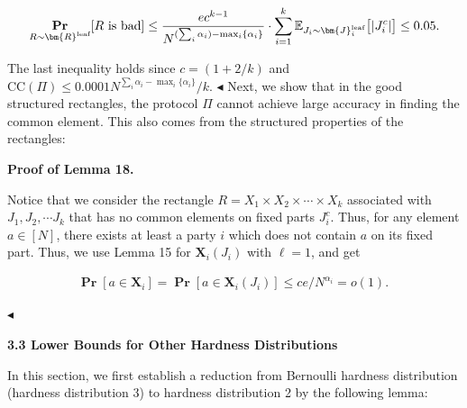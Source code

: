 \documentclass[10pt,a4paper]{article}
\begin{document}
\[\begin{gathered}
\operatorname*{\mathbf{Pr}}_{R\sim\bm{R}^{\text{leaf}}}[R\text{ is bad}]\leq\frac{ec^{k-1}}{N^{(\sum_{i}\alpha_{i})-\mathop{\max}_{i}\{\alpha_{i}\}}}\cdot\sum_{i=1}^{k}\mathbb{E}_{J_{i}\sim\bm{J}_{i}^{\text{leaf}}}\big{[}|J_{i}^{c}|\big{]}\leq 0.05.
\end{gathered}\]


The last inequality holds since $c=(1+2/k)$ and $\text{CC}(\Pi)\leq 0.0001N^{\sum_{i}{\alpha_{i}}-\mathop{\max}_{i}\{\alpha_{i}\}}/k$.
$\blacktriangleleft$
Next, we show that in the good structured rectangles, the protocol $\Pi$ cannot achieve large accuracy in finding the common element. This also comes from the structured properties of the rectangles:\par





\par\medskip\noindent\textbf{Proof of Lemma 18.}\par




Notice that we consider the rectangle $R=X_{1}\times X_{2}\times\cdots\times X_{k}$ associated with $J_{1},J_{2},\cdots J_{k}$ that has no common elements on fixed parts $J_{i}^{c}$. Thus, for any element $a\in[N]$, there exists at least a party $i$ which does not contain $a$ on its fixed part. Thus, we use Lemma 15 for $\bm{X}_{i}(J_{i})$ with $\ell=1$, and get\par


\[\begin{gathered}
\operatorname*{\mathbf{Pr}}[a\in\bm{X}_{i}]=\operatorname*{\mathbf{Pr}}[a\in\bm{X}_{i}(J_{i})]\leq ce/N^{\alpha_{i}}=o(1).\
\end{gathered}\]


$\blacktriangleleft$\par






\par\medskip\noindent\textbf{
3.3 Lower Bounds for Other Hardness Distributions}\par




In this section, we first establish a reduction from Bernoulli hardness distribution (hardness distribution 3) to hardness distribution 2 by the following lemma:\par
\end{document}

